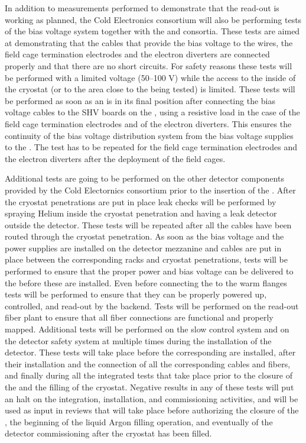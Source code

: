 In addition to measurements performed to demonstrate that the 
read-out is working as planned, the Cold Electronics consortium will also
be performing tests of the bias voltage system together with the 
and  consortia. These tests are aimed at demonstrating that
the cables that provide the bias voltage to the  wires, the
field cage termination electrodes and the electron diverters are connected
properly and that there are no short circuits. For safety reasons these
tests will be performed with a limited voltage (50--100 V) while the access
to the inside of the cryostat (or to the area close to the  being
tested) is limited. These tests will be performed as soon as an 
is in its final position after connecting the bias voltage cables to the 
SHV boards on the , using a resistive load in the case of the 
field cage termination electrodes and of the electron diverters. This ensures
the continuity of the bias voltage distribution system from the bias voltage
supplies to the . The test has to be repeated for the field cage
termination electrodes and the electron diverters after the deployment of
the field cages.

Additional tests are going to be performed on the other detector components
provided by the Cold Electornics consortium prior to the insertion of the
. After the cryostat penetrations are put in place leak checks
will be performed by spraying Helium inside the cryostat penetration and
having a leak detector outside the detector. These tests will be repeated 
after all the cables have been routed through the cryostat penetration.
As soon as the bias voltage and the power supplies are installed on the detector
mezzanine and cables are put in place between the corresponding racks and
cryostat penetrations, tests will be performed to ensure that the proper 
power and bias voltage can be delivered to the  before these
are installed. Even before connecting the  to the warm flanges
tests will be performed to ensure that they can be properly powered up, controlled,
and read-out by the  backend. Tests will be performed on the
read-out fiber plant to ensure that all fiber connections are functional
and properly mapped. Additional tests will be performed on the slow control
system and on the detector safety system at multiple times during the
installation of the detector. These tests will take place before the
corresponding  are installed, after their installation and
the connection of all the corresponding cables and fibers, and finally
during all the integrated tests that take place prior to the closure of
the  and the filling of the cryostat. Negative results in any
of these tests will put an halt on the integration, installation, and
commissioning activities, and will be used as input in reviews that will
take place before authorizing the closure of the , the beginning
of the liquid Argon filling operation, and eventually of the detector 
commissioning after the cryostat has been filled.

